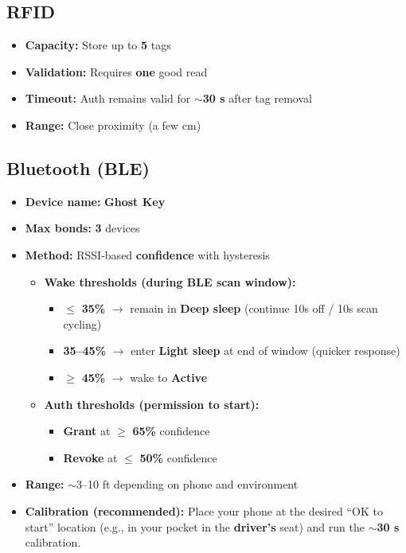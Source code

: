 \documentclass[11pt]{article}
\newcommand{\gkto}{\texorpdfstring{$\rightarrow$}{->}}
\begin{document}
\subsection{RFID}
\begin{itemize}
  \item \textbf{Capacity:} Store up to \textbf{5} tags
  \item \textbf{Validation:} Requires \textbf{one} good read
  \item \textbf{Timeout:} Auth remains valid for \(\sim\)\textbf{30 s} after tag removal
  \item \textbf{Range:} Close proximity (a few cm)
\end{itemize}

\subsection{Bluetooth (BLE)}
\begin{itemize}
  \item \textbf{Device name:} \textbf{Ghost Key}
  \item \textbf{Max bonds:} \textbf{3} devices
  \item \textbf{Method:} RSSI-based \textbf{confidence} with hysteresis
  \begin{itemize}
    \item \textbf{Wake thresholds (during BLE scan window):}
    \begin{itemize}
      \item \(\le\) \textbf{35\%} \gkto{} remain in \textbf{Deep sleep} (continue 10s off / 10s scan cycling)
      \item \textbf{35--45\%} \gkto{} enter \textbf{Light sleep} at end of window (quicker response)
      \item \(\ge\) \textbf{45\%} \gkto{} wake to \textbf{Active}
    \end{itemize}
    \item \textbf{Auth thresholds (permission to start):}
    \begin{itemize}
      \item \textbf{Grant} at \(\ge\) \textbf{65\%} confidence
      \item \textbf{Revoke} at \(\le\) \textbf{50\%} confidence
    \end{itemize}
  \end{itemize}
  \item \textbf{Range:} \(\sim\)3--10 ft depending on phone and environment
  \item \textbf{Calibration (recommended):} Place your phone at the desired ``OK to start'' location (e.g., in your pocket in the \textbf{driver’s} seat) and run the \(\sim\)\textbf{30 s} calibration.
\end{itemize}
\end{document}

